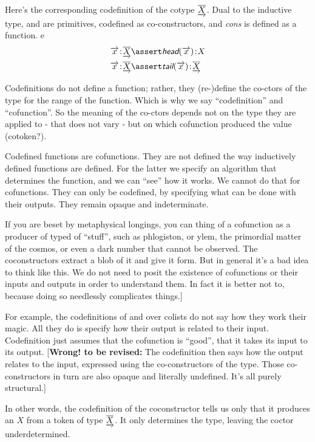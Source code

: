 \documentclass{article}
\begin{document}
Here's the corresponding codefinition of the cotype \(\underrightarrow{\overline{X}}\).
Dual to the inductive type, \head{} and \tail{} are primitives, codefined
as co-constructors, and \textit{cons} is defined as a function.
e
\begin{align}
  \tj{\coseq{x}}{\colist{X}} & \linfer \tj{\head(\coseq{x})}{X} \\
  \tj{\coseq{x}}{\colist{X}} & \linfer \tj{\tail(\coseq{x})}{\colist{X}}
\end{align}



Codefinitions do not define a function; rather, they (re-)define the
co-ctors of the type for the range of the function. Which is why we
say ``codefinition'' and ``cofunction''. So the meaning of the
co-ctors depends not on the type they are applied to - that does not
vary - but on which cofunction produced the value (cotoken?).

Codefined functions are cofunctions. They are not defined the way
inductively defined functions are defined. For the latter we specify
an algorithm that determines the function, and we can ``see'' how it
works. We cannot do that for cofunctions. They can only be codefined,
by specifying what can be done with their outputs. They remain opaque
and indeterminate.

If you are beset by metaphysical longings, you can thing of a
cofunction as a producer of typed of ``stuff'', such as phlogiston, or
ylem, the primordial matter of the cosmos, or even a dark number that
cannot be observed. The coconstructors extract a blob of it and give
it form. But in general it's a bad idea to think like this. We do not
need to posit the existence of cofunctions or their inputs and outputs
in order to understand them. In fact it is better not to, because doing so needlessly complicates things.]

For example, the codefinitions of  and  over
colists do not say how they work their magic. All they do is specify
how their output is related to their input. Codefinition just assumes
that the cofunction is ``good'', that it takes its input to its
output. [\textbf{Wrong! to be revised:}
The codefinition then says how the output relates to the
input, expressed using the co-constructors of the type. Those
co-constructors in turn are also opaque and literally undefined. It's
all purely structural.]

In other words, the codefinition of the coconstructor \cohead{} tells
us only that it produces an \(X\) from a token of type \(\underrightarrow{\overline{X}}\).
It only determines the type, leaving the coctor underdetermined.
\end{document}
